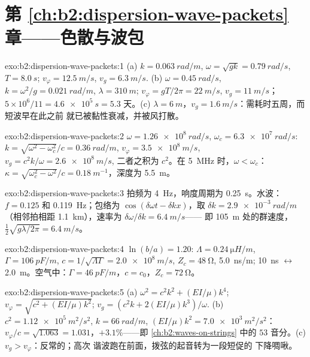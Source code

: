 \section*{第 \ref{ch:b2:dispersion-wave-packets} 章——色散与波包}

\begin{solution}{exo:b2:dispersion-wave-packets:1}
(a) $k = \qty{0.063}{rad/m}$, $\omega = \sqrt{gk} = \qty{0.79}{rad/s}$, $T = \qty{8.0}{s}$;
$v_\varphi = \qty{12.5}{m/s}$, $v_g = \qty{6.3}{m/s}$. (b) $\omega = \qty{0.45}{rad/s}$, $k = \omega^2
/g = \qty{0.021}{rad/m}$, $\lambda = \qty{310}{m}$; $v_\varphi = gT/2\pi = \qty{22}{m/s}$, $v_g =
\qty{11}{m/s}$；$5 \times 10^6/11 = \qty{4.6e5}{s} = 5.3$ 天。(c) $\lambda = \qty{6}{m}$，$v_g
= \qty{1.6}{m/s}$：需耗时五周，而短波早在此之前
就已被黏性衰减，并被风打散。
\end{solution}

\begin{solution}{exo:b2:dispersion-wave-packets:2}
$\omega = \qty{1.26e8}{rad/s}$, $\omega_c = \qty{6.3e7}{rad/s}$: $k = \sqrt{\omega^2 - \omega_c^2}/c =
\qty{0.36}{rad/m}$, $v_\varphi = \qty{3.5e8}{m/s}$, $v_g = c^2k/\omega = \qty{2.6e8}{m/s}$,
二者之积为 $c^2$。在 \qty{5}{MHz} 时，$\omega < \omega_c$：$\kappa = \sqrt{\omega_c^2 - \omega^2}/c =
\qty{0.18}{m^{-1}}$，深度为 \qty{5.5}{m}。
\end{solution}

\begin{solution}{exo:b2:dispersion-wave-packets:3}
拍频为 \qty{4}{Hz}，响度周期为 \qty{0.25}{s}。水波：$f = 0.125$ 和
\qty{0.119}{Hz}；包络为 $\cos(\delta\omega t - \delta kx)$，取 $\delta k = \qty{2.9e-3}{rad/m}$
（相邻拍相距 \qty{1.1}{km}），速率为 $\delta\omega/\delta k = \qty{6.4}{m/s}$——
即 \qty{105}{m} 处的群速度，$\tfrac12\sqrt{g\lambda/2\pi} = \qty{6.4}{m/s}$。
\end{solution}

\begin{solution}{exo:b2:dispersion-wave-packets:4}
$\ln(b/a) = 1.20$: $\Lambda = \qty{0.24}{\micro H/m}$, $\Gamma = \qty{106}{pF/m}$, $c = 1/
\sqrt{\Lambda\Gamma} = \qty{2.0e8}{m/s}$, $Z_c = \qty{48}{\ohm}$, \qty{5.0}{ns/m}; \qty{10}{ns}
$\leftrightarrow$ \qty{2.0}{m}。空气中：$\Gamma = \qty{46}{pF/m}$，$c = c_0$，$Z_c = \qty{72}{\ohm}$。
\end{solution}

\begin{solution}{exo:b2:dispersion-wave-packets:5}
(a) $\omega^2 = c^2k^2 + (EI/\mu)k^4$; $v_\varphi = \sqrt{c^2 + (EI/\mu)k^2}$; $v_g = (c^2k +
2(EI/\mu)k^3)/\omega$. (b) $c^2 = \qty{1.12e5}{m^2/s^2}$, $k = \qty{66}{rad/m}$, $(EI/\mu)k^2
= \qty{7.0e3}{m^2/s^2}$：$v_\varphi/c = \sqrt{1.063} = 1.031$，$+3.1\%$——即
\cref{ch:b2:waves-on-strings} 中的 $53$ 音分。(c) $v_g > v_\varphi$：反常的；高次
谐波跑在前面，拨弦的起音转为一段短促的
下降啁啾。
\end{solution}

